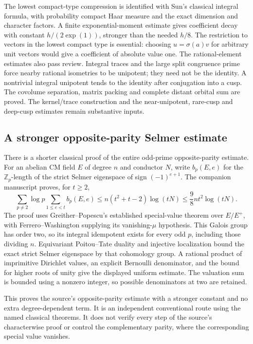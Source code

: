 \documentclass[11pt,a4paper]{article}
\theoremstyle{remark}
\begin{document}
The lowest compact-type compression is identified with Sun's
classical integral formula, with probability compact Haar
measure and the exact dimension and character factors.
\cite{sun-eisenstein,vogan-zuckerman}
A finite exponential-moment estimate gives coefficient decay
with constant $h/(2\exp(1))$, stronger than the needed $h/8$.
The restriction to vectors in the lowest compact type is
essential: choosing $u=\sigma(a)v$ for arbitrary unit vectors
would give a coefficient of absolute value one.
The rational-element estimates also pass review.
Integral traces and the large split congruence prime force
nearby rational isometries to be unipotent; they need not
be the identity. A nontrivial integral unipotent tends to
the identity after conjugation into a cusp.
The covolume separation, matrix packing and complete distant
orbital sum are proved. The kernel/trace construction and
the near-unipotent, rare-cusp and deep-cusp estimates remain
substantive inputs.

\subsection{A stronger opposite-parity Selmer estimate}

There is a shorter classical proof of the entire odd-prime
opposite-parity estimate. For an abelian CM field $E$ of
degree $n$ and conductor $N$, write $b_p(E,e)$ for the
$\mathbb Z_p$-length of the strict Selmer eigenspace of sign
$(-1)^{e+1}$. The companion manuscript proves, for $t\ge2$,
\[
 \sum_{p\ne2}\log p\sum_{1\le e<t}b_p(E,e)
       \le n(t^2+t-2)\log(tN)
       \le\frac98nt^2\log(tN).
\]
The proof uses Greither--Popescu's established special-value
theorem over $E/E^+$, with Ferrero--Washington supplying
its vanishing-$\mu$ hypothesis.
\cite{greither-popescu,ct-fw}
This Galois group has order two, so its integral idempotent
exists for every odd $p$, including those dividing $n$.
Equivariant Poitou--Tate duality and injective localization
bound the exact strict Selmer eigenspace by that cohomology
group. A rational product of imprimitive Dirichlet values,
an explicit Bernoulli denominator, and the bound for higher
roots of unity give the displayed uniform estimate.
The valuation sum is bounded using a nonzero integer, so
possible denominators at two are retained.

This proves the source's opposite-parity estimate with a
stronger constant and no extra degree-dependent term.
It is an independent conventional route using the named
classical theorems. It does not verify every step of the
source's characterwise proof or control the complementary
parity, where the corresponding special value vanishes.
\end{document}
